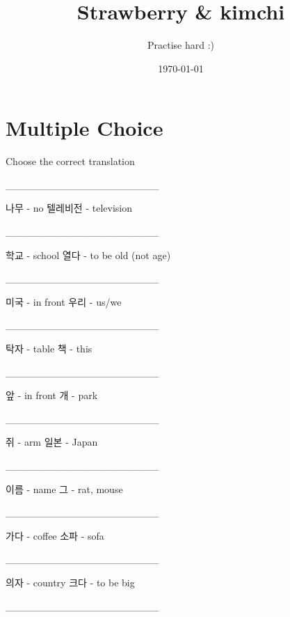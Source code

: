 \documentclass[addpoints, 30pt]{../exam}%
\title{Strawberry \& kimchi}%
\author{Practise hard :)}%
\date{\today}%
\begin{document}
%
\normalsize%
\maketitle%
\section{Multiple Choice}%
Choose the correct translation%
\begin{questions}%
\question[1]%
\_\_\_\_\_\_\_\_\_\_\_\_\_\_\_\_\_\_\_\_\_%
\begin{choices}%
\choice%
나무 {-} no%
\CorrectChoice%
텔레비전 {-} television%
\end{choices}%
\question[1]%
\_\_\_\_\_\_\_\_\_\_\_\_\_\_\_\_\_\_\_\_\_%
\begin{choices}%
\CorrectChoice%
학교 {-} school%
\choice%
열다 {-} to be old (not age)%
\end{choices}%
\question[1]%
\_\_\_\_\_\_\_\_\_\_\_\_\_\_\_\_\_\_\_\_\_%
\begin{choices}%
\choice%
미국 {-} in front%
\CorrectChoice%
우리 {-} us/we%
\end{choices}%
\question[1]%
\_\_\_\_\_\_\_\_\_\_\_\_\_\_\_\_\_\_\_\_\_%
\begin{choices}%
\CorrectChoice%
탁자 {-} table%
\choice%
책 {-} this%
\end{choices}%
\question[1]%
\_\_\_\_\_\_\_\_\_\_\_\_\_\_\_\_\_\_\_\_\_%
\begin{choices}%
\CorrectChoice%
앞 {-} in front%
\choice%
개 {-} park%
\end{choices}%
\question[1]%
\_\_\_\_\_\_\_\_\_\_\_\_\_\_\_\_\_\_\_\_\_%
\begin{choices}%
\choice%
쥐 {-} arm%
\CorrectChoice%
일본 {-} Japan%
\end{choices}%
\question[1]%
\_\_\_\_\_\_\_\_\_\_\_\_\_\_\_\_\_\_\_\_\_%
\begin{choices}%
\CorrectChoice%
이름 {-} name%
\choice%
그 {-} rat, mouse%
\end{choices}%
\question[1]%
\_\_\_\_\_\_\_\_\_\_\_\_\_\_\_\_\_\_\_\_\_%
\begin{choices}%
\choice%
가다 {-} coffee%
\CorrectChoice%
소파 {-} sofa%
\end{choices}%
\question[1]%
\_\_\_\_\_\_\_\_\_\_\_\_\_\_\_\_\_\_\_\_\_%
\begin{choices}%
\choice%
의자 {-} country%
\CorrectChoice%
크다 {-} to be big%
\end{choices}%
\question[1]%
\_\_\_\_\_\_\_\_\_\_\_\_\_\_\_\_\_\_\_\_\_%
\begin{choices}%

\end{choices}
\end{questions}
\end{document}
